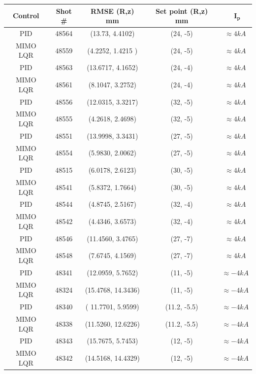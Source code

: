 \begin{center}
	\begin{longtable}{||c| c| c| c|c||} 
		\hline
		\rowcolor{color2}
		\textbf{Control} &  \textbf{Shot \#} &\textbf{RMSE (R,z) mm} & \textbf{ Set point (R,z) mm} &\ $\mathbf{I_p}$ \\ [0.5ex] 
		\hline\hline
		PID & 48564 &  (13.73, 4.4102) & (24, -5)&  $\approx 4 kA$ \\ 
		\hline
		MIMO LQR & 48559 & (4.2252, 1.4215 ) & (24, -5)&  $\approx 4 kA$	\\
		\hline
		PID & 48563 & (13.6717,	4.1652)  & (24, -4)& $\approx 4 kA$ \\ 
		\hline
		MIMO LQR & 48561 & (8.1047,	3.2752) & (24, -4)& $\approx 4 kA$ \\
		\hline
		PID & 48556 & (12.0315,	3.3217)  & (32, -5)& $\approx 4 kA$  \\ 
		\hline
		MIMO LQR & 48555 & (4.2618, 2.4698) & (32, -5) &  $\approx 4 kA$ \\
		\hline
		PID & 48551 & (13.9998,	3.3431)  & (27, -5) &  $\approx 4 kA$ \\ 
		\hline
		MIMO LQR & 48554 & (5.9830, 2.0062)  & (27, -5) &  $\approx 4 kA$ \\
		\hline
		PID & 48515 & (6.0178,	2.6123)  & (30, -5) & $\approx 4 kA$ \\ 
		\hline
		MIMO LQR & 48541 & (5.8372,	1.7664) & (30, -5) &  $\approx 4 kA$\\
		\hline
		PID & 48544 & (4.8745,	2.5167)  & (32, -4)& $\approx 4 kA$ \\ 
		\hline
		MIMO LQR & 48542 & (4.4346,	3.6573) & (32, -4)&  $\approx 4 kA$ \\
		\hline
		PID & 48546 & (11.4560, 3.4765)  & (27, -7)&   $\approx 4 kA$\\ 
		\hline
		MIMO LQR & 48548 & (7.6745, 4.1569) & (27, -7)&  $\approx 4 kA$ \\
		\hline
		PID & 48341 & (12.0959,	5.7652)  & (11, -5)& $\approx -4 kA$\\ 
		\hline
		MIMO LQR & 48324 &  (15.4768,	14.3436)& (11, -5)& $\approx -4 kA$ \\
		\hline
		PID & 48340 & ( 11.7701, 5.9599) & (11.2, -5.5)&  $\approx -4 kA$\\ 
		\hline
		MIMO LQR & 48338 & (11.5260,	12.6226) & (11.2, -5.5) &  $\approx -4 kA$\\
		\hline
		PID & 48343 &(15.7675,	5.7453)   & (12, -5)&  $\approx -4 kA$  \\ 
		\hline
		MIMO LQR & 48342 & (14.5168,	14.4329) & (12, -5)&  $\approx -4 kA$  \\

\end{longtable}
\end{center}
